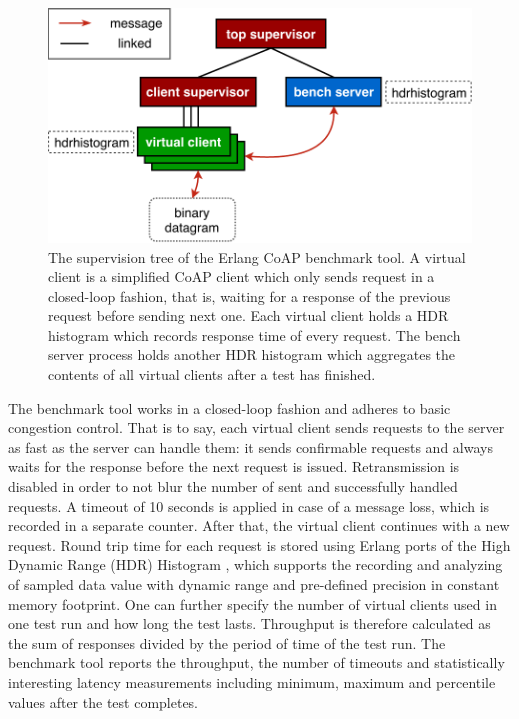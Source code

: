 \begin{figure}[!htbp]
\centering
\includegraphics[scale = 0.7]{ecoap_bench_arch}
\caption[The supervision tree of the Erlang CoAP benchmark tool]{The supervision tree of the Erlang CoAP benchmark tool. A virtual client is a simplified CoAP client which only sends request in a closed-loop fashion, that is, waiting for a response of the previous request before sending next one. Each virtual client holds a HDR histogram which records response time of every request. The bench server process holds another HDR histogram which aggregates the contents of all virtual clients after a test has finished.}
\label{fig:ecoap_bench_arch}
\end{figure}

The benchmark tool works in a closed-loop fashion and adheres to basic congestion control. That is to say, each virtual client sends requests to the server as fast as the server can handle them: it sends confirmable requests and always waits for the response before the next request is issued. Retransmission is disabled in order to not blur the number of sent and successfully handled requests. A timeout of 10 seconds is applied in case of a message loss, which is recorded in a separate counter. After that, the virtual client continues with a new request. Round trip time for each request is stored using Erlang ports of the High Dynamic Range (HDR) Histogram \autocite{hdr_erl}, which supports the recording and analyzing of sampled data value with dynamic range and pre-defined precision in constant memory footprint. One can further specify the number of virtual clients used in one test run and how long the test lasts. Throughput is therefore calculated as the sum of  responses divided by the period of time of the test run. The benchmark tool reports the throughput, the number of timeouts and statistically interesting latency measurements including minimum, maximum and percentile values after the test completes.

